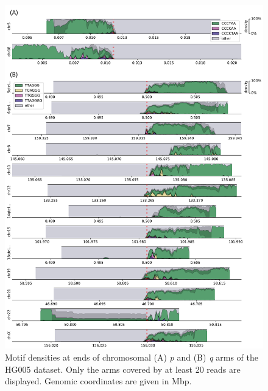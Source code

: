 \documentclass{article}
\begin{document}
\begin{figure}[ht!] \centering
\includegraphics[height=.95\textheight,width=\textwidth,keepaspectratio]{figures/threemotifp/HG005-densityplots-threemotifp.pdf}
\caption{
    Motif densities at ends of chromosomal (A) \textit{p} and (B) \textit{q} arms of the HG005 dataset.
    Only the arms covered by at least 20 reads are displayed.
    Genomic coordinates are given in Mbp.
}
\label{fig:hg005_densityplots}
\end{figure}
\clearpage \pagebreak
\end{document}
